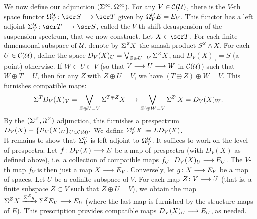 \documentclass{amsart}
\theoremstyle{definition}
\begin{document}
We now define our adjunction $(\Sigma^{\infty},\Omega^{\infty})$. For any $V \in {\mathcal{C}}({\mathcal{U}})$, there is the $V$-th space functor $\OM^{\oU}_V \colon \sS \rtarr \sT$ given by $\Omega^{{\mathcal{U}}}_V E = E_V$. This functor has a left adjoint $\SI^{\oU}_V \colon \sT \rtarr \sS$, called the $V$-th shift desuspension of the suspension spectrum, that we now construct. Let $X \in \sT$. For each finite-dimensional subspace of ${\mathcal{U}}$, denote by $\Sigma^Z X$ the smash product $S^Z \wedge X$. For each $U \in {\mathcal{C}}({\mathcal{U}})$, define the space $D_V(X)_U = \bigvee_{Z \oplus U = V} \Sigma^Z X$, and $D_V(X)_U = S$ (a point) otherwise. If $W \subset U \subset V$ (so that $V \longrightarrow U \longrightarrow W$ in ${\mathcal{C}}({\mathcal{U}})$) such that $W \oplus T = U$, then for any $Z$ with $Z \oplus U = V$, we have $(T \oplus Z) \oplus W = V$. This furnishes compatible maps:
\[\Sigma^T D_V(X)_V = \bigvee_{Z \oplus U = V} \Sigma^{T \oplus Z} X \longrightarrow \bigvee_{Z' \oplus W = V} \Sigma^{Z'}X = D_V(X)_W.\]
By the $(\Sigma^Z, \Omega^Z)$ adjunction, this furnishes a prespectrum $D_V(X) = \{D_V(X)_U\}_{U \in {\mathcal{C}}({\mathcal{U}})}.$ We define $\Sigma^{{\mathcal{U}}}_V X := LD_V(X)$.\\
It remains to show that $\Sigma^{{\mathcal{U}}}_V$ is left adjoint to $\Omega^{{\mathcal{U}}}_V$. It suffices to work on the level of prespectra. Let $f \colon D_V(X) \longrightarrow E$ be a map of prespectra (with $D_V(X)$ as defined above), i.e. a collection of compatible maps $f_U \colon D_V(X)_U \longrightarrow E_U$. The $V$-th map $f_V$ is then just a map $X \longrightarrow E_V$. Conversely, let $g \colon X \longrightarrow E_V$ be a map of spaces. Let $U$ be a cofinite subspace of $V$. For each map $Z \colon V \longrightarrow U$ (that is, a finite subspace $Z \subset V$ such that $Z \oplus U = V$), we obtain the map $\Sigma^Z X \xrightarrow{\Sigma^Z g} \Sigma^Z E_V \longrightarrow E_U$ (where the last map is furnished by the structure maps of $E$). This prescription provides compatible maps $D_V(X)_U \longrightarrow E_U$, as needed.\\
\end{document}
